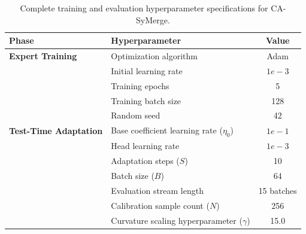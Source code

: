 \documentclass{article}
\begin{document}
\begin{table}[h]
\caption{Complete training and evaluation hyperparameter specifications for CA-SyMerge.}
\label{tab:hyperparams}
\centering
\begin{tabular}{llc}
\toprule
\textbf{Phase} & \textbf{Hyperparameter} & \textbf{Value} \\
\midrule
\textbf{Expert Training} 
& Optimization algorithm & Adam \\
& Initial learning rate & $1e-3$ \\
& Training epochs & 5 \\
& Training batch size & 128 \\
& Random seed & 42 \\
\midrule
\textbf{Test-Time Adaptation} 
& Base coefficient learning rate ($\eta_0$) & $1e-1$ \\
& Head learning rate & $1e-3$ \\
& Adaptation steps ($S$) & 10 \\
& Batch size ($B$) & 64 \\
& Evaluation stream length & 15 batches \\
& Calibration sample count ($N$) & 256 \\
& Curvature scaling hyperparameter ($\gamma$) & 15.0 \\
\bottomrule
\end{tabular}
\end{table}
\end{document}
